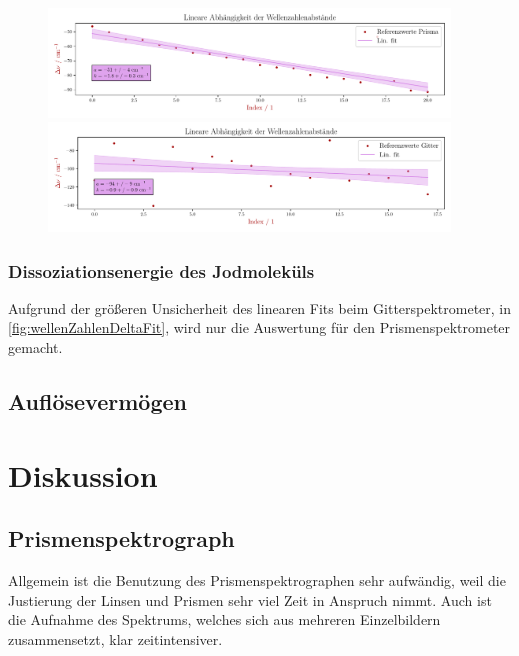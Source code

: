 \documentclass[12pt,english,ngerman]{scrartcl}
\begin{document}
\begin{figure}[H]
	\begin{center}
		\includegraphics[width=0.95\textwidth]{figures/waveNumberDeltasFitPrisma.pdf}
		\includegraphics[width=0.95\textwidth]{figures/waveNumberDeltasFitGitter.pdf}
	\end{center}
	\caption{}\label{fig:wellenZahlenDeltaFit}

\end{figure}

\subsubsection{Dissoziationsenergie des Jodmoleküls}
Aufgrund der größeren Unsicherheit des linearen Fits beim Gitterspektrometer,
in \autoref{fig:wellenZahlenDeltaFit}, wird nur die Auswertung für den
Prismenspektrometer gemacht.

\subsection{Auflösevermögen}

\section{Diskussion}\label{sec:disk}

\subsection{Prismenspektrograph}

Allgemein ist die Benutzung des Prismenspektrographen sehr aufwändig, weil die
Justierung der Linsen und Prismen sehr viel Zeit in Anspruch nimmt. Auch ist
die Aufnahme des Spektrums, welches sich aus mehreren Einzelbildern
zusammensetzt, klar zeitintensiver.
\end{document}
